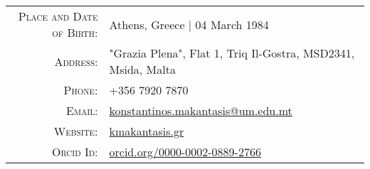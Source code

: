\documentclass[a4paper,10pt]{article}
\begin{document}
\begin{tabular}{rl}
    \textsc{Place and Date of Birth:} & Athens, Greece  | 04 March 1984 \\
    \textsc{Address:}   & "Grazia Plena", Flat 1, Triq Il-Gostra, MSD2341, Msida, Malta \\
    \textsc{Phone:}     & +356 7920 7870 \\
    \textsc{Email:}     & \href{mailto:konstantinos.makantasis@um.edu.mt}{konstantinos.makantasis@um.edu.mt} \\
    \textsc{Website:}     & \href{http://www.kmakantasis.gr}{kmakantasis.gr}\\
    \textsc{Orcid Id:} & \href{https://orcid.org/0000-0002-0889-2766}{orcid.org/0000-0002-0889-2766}
\end{tabular}

\vspace{0.1in}
\end{document}

